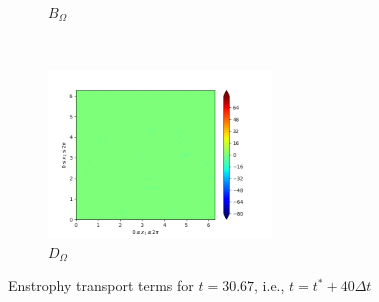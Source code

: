 \begin{figure}[H]
\begin{subfigure}{0.45\textwidth}
        \caption{$B_{\Omega}$}
    \end{subfigure}
    ~
    \begin{subfigure}{0.45\textwidth}
        \includegraphics[height=1.75in]{media/run-cds-65/D-enst-1380.png}
        \caption{$D_{\Omega}$}
    \end{subfigure}
    \caption{Enstrophy transport terms for $t=30.67$, i.e., $t=t^{\ast} + 40 \Delta t$}
\end{figure}

\newpage

